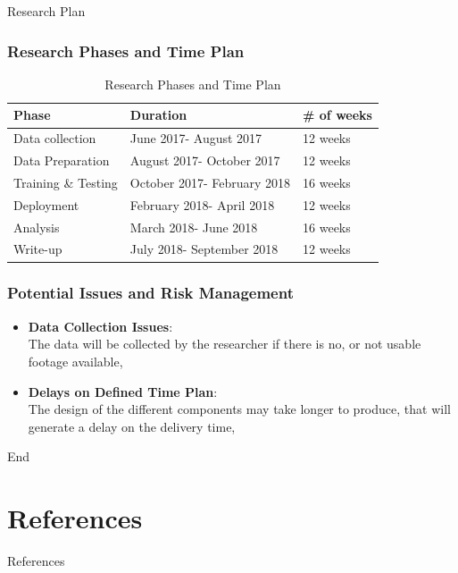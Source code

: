\documentclass{beamer}
\begin{document}
\begin{frame}
\Huge Research Plan
\end{frame}

\begin{frame}
\frametitle{Research Phases and Time Plan}

\begin{table}[h!]
	\centering
	\begin{center}
		\begin{tabular}{ | l | l | l |}
			\hline
			\textbf{Phase} & \textbf{Duration} & \textbf{\# of weeks} \\ \hline
			Data collection & June 2017- August 2017 & 12 weeks \\ \hline
			Data Preparation & August 2017- October 2017 & 12 weeks \\ \hline
			Training \& Testing & October 2017- February 2018 & 16 weeks \\ \hline
			Deployment & February 2018- April 2018 & 12 weeks \\ \hline
			Analysis & March 2018- June 2018 & 16 weeks \\ \hline			
			Write-up & July 2018- September 2018 & 12 weeks \\ \hline
			
		\end{tabular}
	\end{center}
	\caption{Research Phases and Time Plan}
	\label{timeplan}
\end{table}

\end{frame}

\begin{frame}
\frametitle{Potential Issues and Risk Management}
\begin{itemize}
	\item \textbf{Data Collection Issues}:\\
	The data will be collected by the researcher if there is no, or not usable footage available,
	\item \textbf{Delays on Defined Time Plan}:\\
	The design of the different components may take longer to produce, that will generate a delay on the delivery time,
\end{itemize}
\end{frame}


\begin{frame}
\Huge{\centerline{End}}
\end{frame}


\section{References}
\begin{frame}[allowframebreaks]{References}%
\footnotesize{

}
\end{frame}
\end{document}
